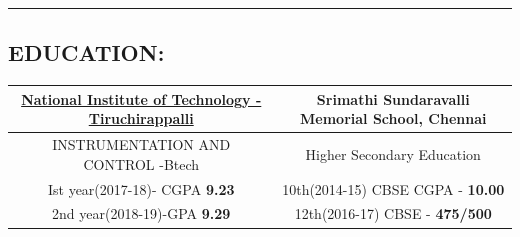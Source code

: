 \documentclass[10pts]{report}
\begin{document}
\par\noindent\rule{\textwidth}{0.4pt}
\begin{flushleft}
           \section*{EDUCATION:}
                    \begin{tabular}{|c|c|}
                           \hline
                           { \href{https://www.nitt.edu/}{\textbf{National Institute of Technology - Tiruchirappalli} }}&{\textbf{ Srimathi Sundaravalli Memorial School, Chennai } } \\
                            \hline\hline
                           { INSTRUMENTATION AND CONTROL -Btech  }&{Higher Secondary Education}      \\   
                           \hline
                        
                            {Ist year(2017-18)- CGPA \textbf{9.23}}&{10th(2014-15) CBSE CGPA - \textbf{10.00}}       \\
                           \hline
                            {2nd year(2018-19)-GPA \textbf{9.29}}&{12th(2016-17) CBSE - \textbf{475/500} }       \\
                            \hline\hline
                    \end{tabular}

\end{flushleft}
\end{document}
